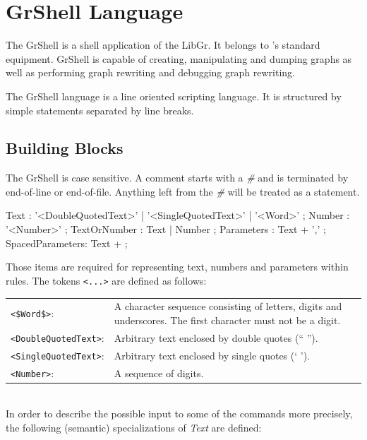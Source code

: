 \chapter{GrShell Language}

The GrShell is a shell application of the LibGr. It belongs to \GrG's standard equipment. GrShell is capable of creating, manipulating and dumping graphs as well as performing graph rewriting and debugging graph rewriting.

The GrShell language is a line oriented scripting language. It is structured by simple statements separated by line breaks.

\section{Building Blocks}

The GrShell is case sensitive. A comment starts with a \emph{\#} and is terminated by end-of-line or end-of-file. Anything left from the \emph{\#} will be treated as a statement.

\begin{rail} 
 Text : '<DoubleQuotedText>' | '<SingleQuotedText>' | '<Word>' ;
 Number : '<Number>' ;
 TextOrNumber : Text | Number ;
 Parameters : Text + ',' ;
 SpacedParameters: Text + ; 
\end{rail}

Those items are required for representing text, numbers and parameters within rules. The tokens \verb+<...>+ are defined as follows:\\

\begin{tabularx}{\linewidth}{lX}
\verb+<$Word$>+:            & A character sequence consisting of letters, digits and underscores. The first character must not be a digit.\\
\verb+<DoubleQuotedText>+:  & Arbitrary text enclosed by double quotes (`` '').\\
\verb+<SingleQuotedText>+:  & Arbitrary text enclosed by single quotes (` ').\\
\verb+<Number>+:            & A sequence of digits.
\end{tabularx}\\

In order to describe the possible input to some of the commands more precisely, the following (semantic) specializations of \emph{Text} are defined:\\

